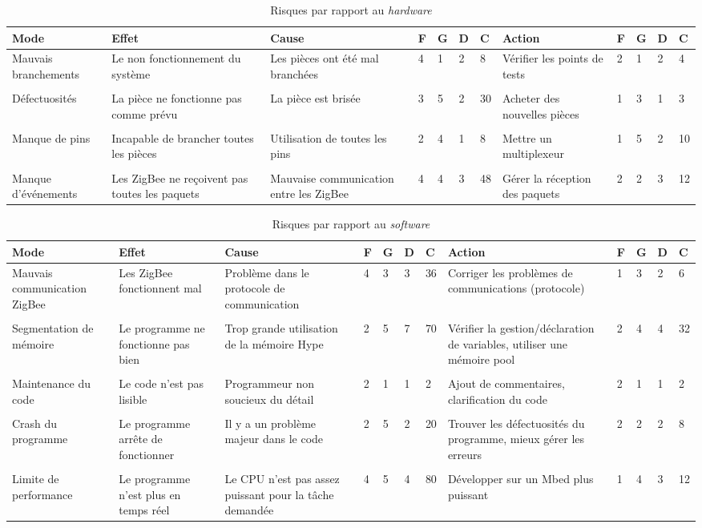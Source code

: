\begin{table}[h]
	\centering
	\caption{Risques par rapport au \emph{hardware}}
	\begin{tabular}{P{2cm}P{2cm}P{2cm}llllP{2cm}llll}
		\hline
		\bf Mode & \bf Effet & \bf Cause & \bf F & \bf G & \bf D & \bf C & \bf Action & \bf F & \bf G & \bf D & \bf C  \\
		\hline
		\hline
		Mauvais branchements & Le non fonctionnement du système & Les pièces ont été mal branchées & 4 & 1 & 2 & 8 & Vérifier les points de tests & 2 & 1 & 2 & 4 \\\\
		Défectuosités & La pièce ne fonctionne pas comme prévu & La pièce est brisée & 3 & 5 & 2 & 30 &	Acheter des nouvelles pièces & 1 & 3 & 1 & 3 \\\\
		Manque de pins & Incapable de brancher toutes les pièces & Utilisation de toutes les pins & 2 & 4 & 1 & 8 & Mettre un multiplexeur & 1 & 5 & 2 & 10 \\\\
        Manque d'événements & Les ZigBee ne reçoivent pas toutes les paquets & Mauvaise communication entre les ZigBee & 4 & 4 & 3 & 48 & Gérer la réception des paquets & 2 & 2 & 3 & 12 \\
		\hline
	\end{tabular}
\end{table}

\begin{table}[h]
	\centering
	\caption{Risques par rapport au \emph{software}}
	\begin{tabular}{P{2cm}P{2cm}P{2cm}llllP{2cm}llll}
		\hline
		\bf Mode & \bf Effet & \bf Cause & \bf F & \bf G & \bf D & \bf C & \bf Action & \bf F & \bf G & \bf D & \bf C  \\
		\hline
		\hline
		Mauvais communication ZigBee & Les ZigBee fonctionnent mal & Problème dans le protocole de communication & 4 & 3 & 3 & 36 & Corriger les problèmes de communications (protocole) & 1 & 3 & 2 & 6 \\\\ 
		Segmentation de mémoire & Le programme ne fonctionne pas bien & Trop grande utilisation de la mémoire Hype & 2 & 5 & 7 & 70 & Vérifier la gestion/déclaration de variables, utiliser une mémoire pool & 2 & 4 & 4 & 32 \\\\
		Maintenance du code & Le code n'est pas lisible & Programmeur non soucieux du détail & 2 & 1 & 1 & 2 & Ajout de commentaires, clarification du code & 2 & 1 & 1 & 2 \\\\
		Crash du programme & Le programme arrête de fonctionner & Il y a un problème majeur dans le code & 2 & 5 & 2 & 20 & Trouver les défectuosités du programme, mieux gérer les erreurs & 2 & 2 & 2 & 8 \\\\
		Limite de performance & Le programme n'est plus en temps réel & Le CPU n'est pas assez puissant pour la tâche demandée & 4 & 5 & 4 & 80 & Développer sur un Mbed plus puissant & 1 & 4 & 3 & 12 \\
		
		\hline
	\end{tabular}
\end{table}
